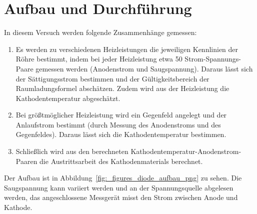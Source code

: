 \newpage
\section{Aufbau und Durchführung}\label{sec:aufbau-und-durchfuehrung}

In diesem Versuch werden folgende Zusammenhänge gemessen:
\begin{enumerate}
	\item Es werden zu verschiedenen Heizleistungen die jeweiligen Kennlinien der Röhre bestimmt, indem bei jeder Heizleistung etwa 50 Strom-Spannungs-Paare gemessen werden (Anodenstrom und Saugspannung). Daraus lässt sich der Sättigungsstrom bestimmen und der Gültigkeitsbereich der Raumladungsformel abschätzen. Zudem wird aus der Heizleistung die Kathodentemperatur abgeschätzt.

	\item Bei größtmöglicher Heizleistung wird ein Gegenfeld angelegt und der Anlaufstrom bestimmt (durch Messung des Anodenstroms und des Gegenfeldes). Daraus lässt sich die Kathodentemperatur bestimmen.

	\item Schließlich wird aus den berechneten Kathodentemperatur-Anodenstrom-Paaren die Austrittsarbeit des Kathodenmaterials berechnet.
\end{enumerate}

Der Aufbau ist in Abbildung~\ref{fig:_figures_diode_aufbau_png} zu sehen. Die Saugspannung kann variiert werden und an der Spannungsquelle abgelesen werden, das angeschlossene Messgerät misst den Strom zwischen Anode und Kathode.